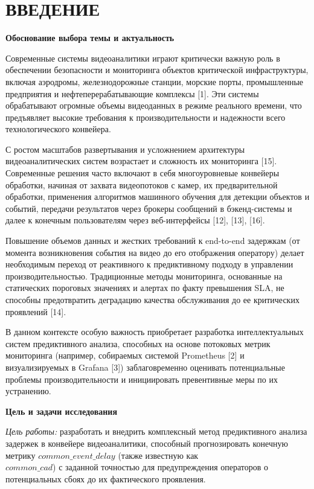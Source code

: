 \newpage
\chapter*{ВВЕДЕНИЕ}  


\textbf{Обоснование выбора темы и актуальность}

Современные системы видеоаналитики играют критически важную роль в обеспечении безопасности и мониторинга объектов критической инфраструктуры, включая аэродромы, железнодорожные станции, морские порты, промышленные предприятия и нефтеперерабатывающие комплексы [1]. Эти системы обрабатывают огромные объемы видеоданных в режиме реального времени, что предъявляет высокие требования к производительности и надежности всего технологического конвейера.

С ростом масштабов развертывания и усложнением архитектуры видеоаналитических систем возрастает и сложность их мониторинга [15]. Современные решения часто включают в себя многоуровневые конвейеры обработки, начиная от захвата видеопотоков с камер, их предварительной обработки, применения алгоритмов машинного обучения для детекции объектов и событий, передачи результатов через брокеры сообщений в бэкенд-системы и далее к конечным пользователям через веб-интерфейсы [12], [13], [16].

Повышение объемов данных и жестких требований к end-to-end задержкам (от момента возникновения события на видео до его отображения оператору) делает необходимым переход от реактивного к предиктивному подходу в управлении производительностью. Традиционные методы мониторинга, основанные на статических пороговых значениях и алертах по факту превышения SLA, не способны предотвратить деградацию качества обслуживания до ее критических проявлений [14].

В данном контексте особую важность приобретает разработка интеллектуальных систем предиктивного анализа, способных на основе потоковых метрик мониторинга (например, собираемых системой Prometheus [2] и визуализируемых в Grafana [3]) заблаговременно оценивать потенциальные проблемы производительности и инициировать превентивные меры по их устранению.

\textbf{Цель и задачи исследования}

\textit{Цель работы:} разработать и внедрить комплексный метод предиктивного анализа задержек в конвейере видеоаналитики, способный прогнозировать конечную метрику $common\_event\_delay$ (также известную как \\$common\_cad$) с заданной точностью для предупреждения операторов о потенциальных сбоях до их фактического проявления.

